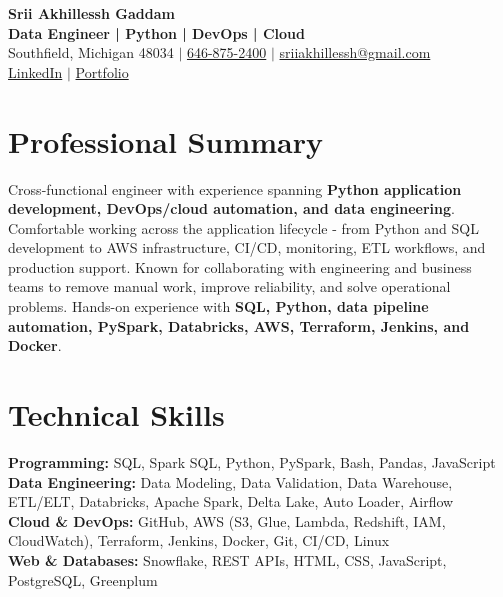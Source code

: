 \documentclass[letterpaper,10pt]{article}
\begin{document}
\fontsize{9.35pt}{10.45pt}\selectfont

\begin{center}
    {\LARGE \textbf{Srii Akhillessh Gaddam}} \\[-1pt]
    \textbf{Data Engineer | Python | DevOps | Cloud} \\[2pt]
    Southfield, Michigan 48034 $|$
    \href{tel:6468752400}{646-875-2400} $|$
    \href{mailto:sriiakhillessh@gmail.com}{sriiakhillessh@gmail.com} \\[1pt]
    \href{https://www.linkedin.com/in/srii-akhiilessh-gaddam-b48668191/}{LinkedIn} $|$
    \href{https://sriiakhillesshg.github.io/portfolio/}{Portfolio}
\end{center}
\vspace{-8pt}

\section{Professional Summary}
\small{Cross-functional engineer with experience spanning \textbf{Python application development, DevOps/cloud automation, and data engineering}. Comfortable working across the application lifecycle - from Python and SQL development to AWS infrastructure, CI/CD, monitoring, ETL workflows, and production support. Known for collaborating with engineering and business teams to remove manual work, improve reliability, and solve operational problems. Hands-on experience with \textbf{SQL, Python, data pipeline automation, PySpark, Databricks, AWS, Terraform, Jenkins, and Docker}.}

\section{Technical Skills}
\small{
\textbf{Programming:} SQL, Spark SQL, Python, PySpark, Bash, Pandas, JavaScript \\
\textbf{Data Engineering:} Data Modeling, Data Validation, Data Warehouse, ETL/ELT, Databricks, Apache Spark, Delta Lake, Auto Loader, Airflow \\
\textbf{Cloud \& DevOps:} GitHub, AWS (S3, Glue, Lambda, Redshift, IAM, CloudWatch), Terraform, Jenkins, Docker, Git, CI/CD, Linux \\
\textbf{Web \& Databases:} Snowflake, REST APIs, HTML, CSS, JavaScript, PostgreSQL, Greenplum
}
\end{document}

